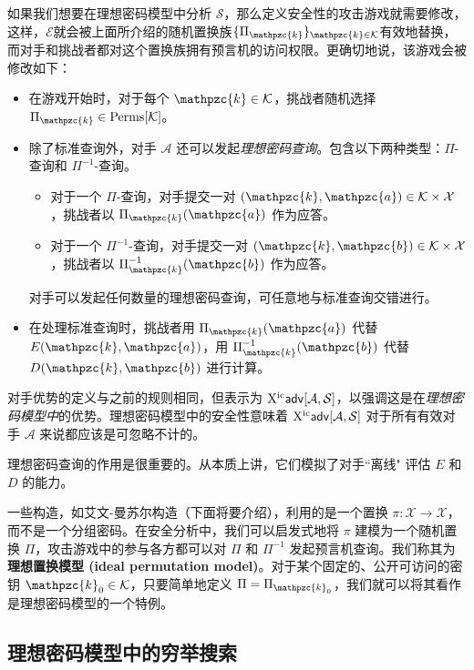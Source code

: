 如果我们想要在理想密码模型中分析 $\mathcal{S}$，那么定义安全性的攻击游戏就需要修改，这样，$\mathcal{E}$就会被上面所介绍的随机置换族$\{\Pi_\mathpzc{k}\}_{\mathpzc{k}\in\mathcal{K}}$有效地替换，而对手和挑战者都对这个置换族拥有预言机的访问权限。更确切地说，该游戏会被修改如下：
\begin{itemize}
	\item 在游戏开始时，对于每个 $\mathpzc{k}\in\mathcal{K}$，挑战者随机选择 $\Pi_\mathpzc{k}\in\rm{Perms}[\mathcal{K}]$。
	\item 除了标准查询外，对手 $\mathcal{A}$ 还可以发起\emph{理想密码查询}。包含以下两种类型：$\Pi$-查询和 $\Pi^{-1}$-查询。
	\begin{itemize}
		\item 对于一个 $\Pi$-查询，对手提交一对 $(\mathpzc{k},\mathpzc{a})\in\mathcal{K}\times\mathcal{X}$，挑战者以 $\Pi_\mathpzc{k}(\mathpzc{a})$ 作为应答。
		\item 对于一个 $\Pi^{-1}$-查询，对手提交一对 $(\mathpzc{k},\mathpzc{b})\in\mathcal{K}\times\mathcal{X}$，挑战者以 $\Pi_\mathpzc{k}^{-1}(\mathpzc{b})$ 作为应答。
	\end{itemize}
	对手可以发起任何数量的理想密码查询，可任意地与标准查询交错进行。
	\item 在处理标准查询时，挑战者用 $\Pi_\mathpzc{k}(\mathpzc{a})$ 代替 $E(\mathpzc{k},\mathpzc{a})$，用 $\Pi_\mathpzc{k}^{-1}(\mathpzc{b})$ 代替 $D(\mathpzc{k},\mathpzc{b})$ 进行计算。
\end{itemize}
对手优势的定义与之前的规则相同，但表示为 ${\rm X^{ic}}\mathsf{adv}[\mathcal{A},\mathcal{S}]$，以强调这是在\emph{理想密码模型中}的优势。理想密码模型中的安全性意味着 ${\rm X^{ic}}\mathsf{adv}[\mathcal{A},\mathcal{S}]$ 对于所有有效对手 $\mathcal{A}$ 来说都应该是可忽略不计的。

理想密码查询的作用是很重要的。从本质上讲，它们模拟了对手``离线" 评估 $E$ 和 $D$ 的能力。

\begin{snote}[理想置换模型。]
一些构造，如艾文-曼苏尔构造（下面将要介绍），利用的是一个置换 $\pi:\mathcal{X}\to\mathcal{X}$，而不是一个分组密码。在安全分析中，我们可以启发式地将 $\pi$ 建模为一个随机置换 $\Pi$，攻击游戏中的参与各方都可以对 $\Pi$ 和 $\Pi^{-1}$ 发起预言机查询。我们称其为\textbf{理想置换模型 (ideal permutation model)}。对于某个固定的、公开可访问的密钥 $\mathpzc{k}_0\in\mathcal{K}$，只要简单地定义 $\Pi=\Pi_{\mathpzc{k}_0}$，我们就可以将其看作是理想密码模型的一个特例。
\end{snote}

\subsection{理想密码模型中的穷举搜索}\label{subsec:4-7-2}

